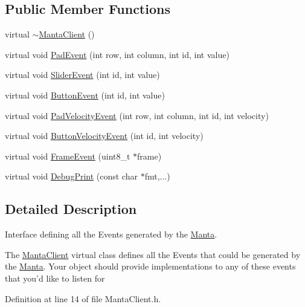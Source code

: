\subsection*{\-Public \-Member \-Functions}
\begin{DoxyCompactItemize}
\item 
virtual \hyperlink{classMantaClient_acb325c79f36cd16a8c3dc7e1a3c8ad9b}{$\sim$\-Manta\-Client} ()
\item 
virtual void \hyperlink{classMantaClient_a01eb0619786b8da9f61c9ae3ece3e148}{\-Pad\-Event} (int row, int column, int id, int value)
\item 
virtual void \hyperlink{classMantaClient_a89a4d91d04b59529cef6912db0f3c691}{\-Slider\-Event} (int id, int value)
\item 
virtual void \hyperlink{classMantaClient_aa9a4b72e3525be490565b4685569e1b3}{\-Button\-Event} (int id, int value)
\item 
virtual void \hyperlink{classMantaClient_a075ff600704f78e398bebf06bed0864e}{\-Pad\-Velocity\-Event} (int row, int column, int id, int velocity)
\item 
virtual void \hyperlink{classMantaClient_aa89f656018329e0e5ab278a7b48c58a4}{\-Button\-Velocity\-Event} (int id, int velocity)
\item 
virtual void \hyperlink{classMantaClient_ad1f6be552a923b6710fc7dde130f821b}{\-Frame\-Event} (uint8\-\_\-t $\ast$frame)
\item 
virtual void \hyperlink{classMantaClient_a7ba99e479e69b7a8582ac81822ccdd5a}{\-Debug\-Print} (const char $\ast$fmt,...)
\end{DoxyCompactItemize}


\subsection{\-Detailed \-Description}
\-Interface defining all the \-Events generated by the \hyperlink{classManta}{\-Manta}. 

\-The \hyperlink{classMantaClient}{\-Manta\-Client} virtual class defines all the \-Events that could be generated by the \hyperlink{classManta}{\-Manta}. \-Your object should provide implementations to any of these events that you'd like to listen for 

\-Definition at line 14 of file \-Manta\-Client.\-h.



